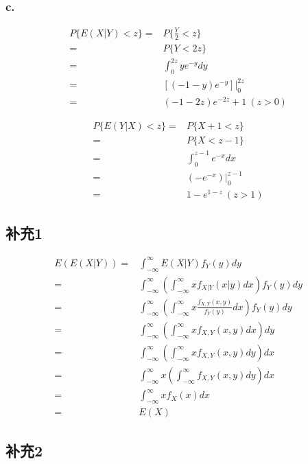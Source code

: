\documentclass[a4paper,12pt]{ctexart}
\begin{document}
\subsubsection*{c.}

\begin{align*}
	P\{E(X|Y) < z\} =& P\{\frac{Y}{2} < z\} \\
	=& P\{Y < 2z\} \\
	=& \int_{0}^{2z} ye^{-y} dy \\
	=& [(-1-y)e^{-y}] \bigg|_{0}^{2z} \\
	=& (-1-2z)e^{-2z} + 1 \ (z > 0)
\end{align*}

\begin{align*}
	P\{E(Y|X) < z\} =& P\{X + 1 < z\} \\
	=& P\{X < z - 1\} \\
	=& \int_{0}^{z-1} e^{-x} dx \\
	=& (-e^{-x}) \bigg|_{0}^{z-1} \\
	=& 1 - e^{1-z} \ (z > 1)
\end{align*}

\subsection*{补充1}

\begin{align*}
	E(E(X|Y)) =& \int_{-\infty}^{\infty} E(X|Y) f_Y(y) dy \\
	=& \int_{-\infty}^{\infty} \left(\int_{-\infty}^{\infty} x f_{X|Y}(x|y) dx\right) f_Y(y) dy \\
	=& \int_{-\infty}^{\infty} \left(\int_{-\infty}^{\infty} x \frac{f_{X,Y}(x,y)}{f_Y(y)} dx\right) f_Y(y) dy \\
	=& \int_{-\infty}^{\infty} \left(\int_{-\infty}^{\infty} x f_{X,Y}(x,y) dx\right) dy \\
	=& \int_{-\infty}^{\infty} \left(\int_{-\infty}^{\infty} x f_{X,Y}(x,y) dy\right) dx \\
	=& \int_{-\infty}^{\infty} x \left(\int_{-\infty}^{\infty} f_{X,Y}(x,y) dy\right) dx \\
	=& \int_{-\infty}^{\infty} x f_X(x) dx \\
	=& E(X)
\end{align*}

\subsection*{补充2}
\end{document}
